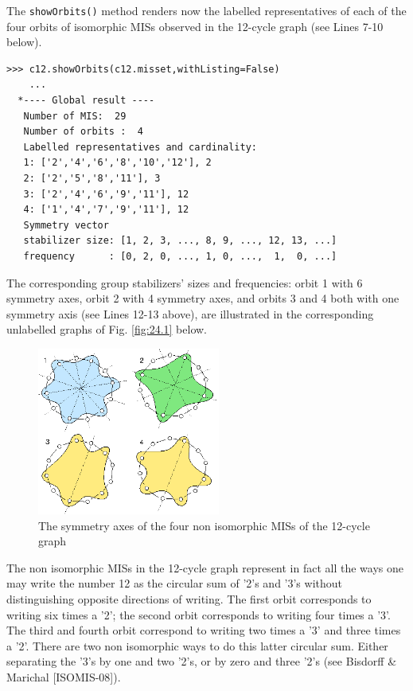 The \texttt{showOrbits()} method renders now the labelled representatives of each of the four orbits of isomorphic MISs observed in the 12-cycle graph (see Lines 7-10 below).
\begin{lstlisting}
>>> c12.showOrbits(c12.misset,withListing=False)
    ...
  *---- Global result ----
   Number of MIS:  29
   Number of orbits :  4
   Labelled representatives and cardinality:
   1: ['2','4','6','8','10','12'], 2
   2: ['2','5','8','11'], 3
   3: ['2','4','6','9','11'], 12
   4: ['1','4','7','9','11'], 12
   Symmetry vector
   stabilizer size: [1, 2, 3, ..., 8, 9, ..., 12, 13, ...]
   frequency      : [0, 2, 0, ..., 1, 0, ...,  1,  0, ...]
\end{lstlisting}
The corresponding group stabilizers' sizes and frequencies: orbit 1 with 6 symmetry axes, orbit 2 with 4 symmetry axes, and orbits 3 and 4 both with one symmetry axis (see Lines 12-13 above), are illustrated in the corresponding unlabelled graphs of Fig. \ref{fig:24.1} below.
\begin{figure}[h]
\sidecaption
\includegraphics[width=6cm]{Figures/c12.png}
\caption{The symmetry axes of the four non isomorphic MISs of the 12-cycle graph} 
\label{fig:24.2}       %
\end{figure}

The non isomorphic MISs in the 12-cycle graph represent in fact all the ways one may write the number 12 as the circular sum of '2's and '3's without distinguishing opposite directions of writing. The first orbit corresponds to writing six times a '2'; the second orbit corresponds to writing four times a '3'. The third and fourth orbit correspond to writing two times a '3' and three times a '2'. There are two non isomorphic ways to do this latter circular sum. Either separating the '3's by one and two '2's, or by zero and three '2's (see Bisdorff \& Marichal [ISOMIS-08]).
 
